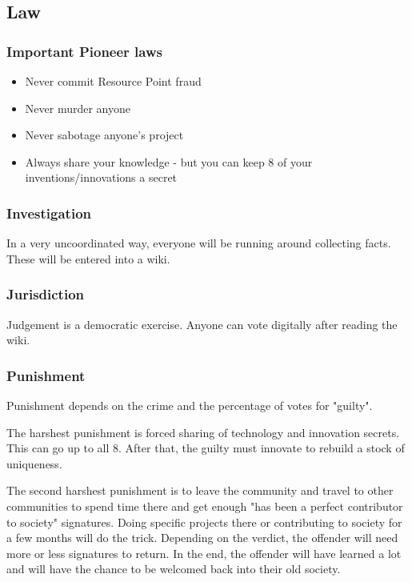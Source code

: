 \subsection{Law}
\label{sec: pioneer law}

\subsubsection{Important Pioneer laws}

\begin{itemize}
\item{Never commit Resource Point fraud}
\item{Never murder anyone}
\item{Never sabotage anyone's project}
\item{Always share your knowledge - but you can keep 8 of your inventions/innovations a secret}   %
\end{itemize}

\subsubsection{Investigation}

In a very uncoordinated way, everyone will be running around collecting facts. These will be entered into a wiki.

\subsubsection{Jurisdiction}

Judgement is a democratic exercise. Anyone can vote digitally after reading the wiki.

\subsubsection{Punishment}

Punishment depends on the crime and the percentage of votes for "guilty".

The harshest punishment is forced sharing of technology and innovation secrets. This can go up to all 8. After that, the guilty must innovate to rebuild a stock of uniqueness.

The second harshest punishment is to leave the community and travel to other communities to spend time there and get enough "has been a perfect contributor to society" signatures. Doing specific projects there or contributing to society for a few months will do the trick. Depending on the verdict, the offender will need more or less signatures to return. In the end, the offender will have learned a lot and will have the chance to be welcomed back into their old society.

